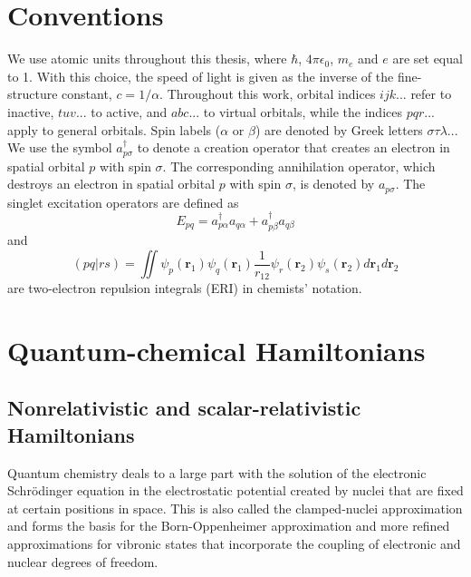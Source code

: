 \section{Conventions}
We use atomic units throughout this thesis, where $\hbar$, $4\pi\epsilon_0$, $m_e$ and $e$ are set equal to 1.\cite{SzaboO_1996_} With this choice, the speed of light is given as the inverse of the fine-structure constant, $c=1/\alpha$. Throughout this work, orbital indices $ijk...$ refer to inactive, $tuv...$ to active, and $abc...$ to virtual orbitals, while the indices $pqr...$ apply to general orbitals. Spin labels ($\alpha$ or $\beta$) are denoted by Greek letters $\sigma\tau\lambda...$
We use the symbol $a^\dagger_{p\sigma}$ to denote a creation operator that creates an electron in spatial orbital $p$ with spin $\sigma$. The corresponding annihilation operator, which destroys an electron in spatial orbital $p$ with spin $\sigma$, is denoted by $a_{p\sigma}$. The singlet excitation operators\cite{HelgaJO_2000_} are defined as
\begin{equation}
\label{Eq:definition_Epq}
E_{pq} = a^\dagger_{p\alpha}a_{q\alpha} + a^\dagger_{p\beta}a_{q\beta}
\end{equation}
and
\begin{equation}
(pq|rs) = \iint \psi_p(\mathbf{r}_1) \psi_q(\mathbf{r}_1) \frac{1}{r_{12}} \psi_r(\mathbf{r}_2) \psi_s(\mathbf{r}_2) d\mathbf{r}_1 d\mathbf{r}_2
\end{equation}
are two-electron repulsion integrals (ERI) in chemists' notation.\cite{SzaboO_1996_}

\section{Quantum-chemical Hamiltonians}
\label{Sec:Hamiltonians}
\subsection{Nonrelativistic and scalar-relativistic Hamiltonians}
Quantum chemistry deals to a large part with the solution of the electronic Schrödinger equation in the electrostatic potential created by nuclei that are fixed at certain positions in space. This is also called the clamped-nuclei approximation and forms the basis for the Born-Oppenheimer approximation and more refined approximations for vibronic states that incorporate the coupling of electronic and nuclear degrees of freedom.

